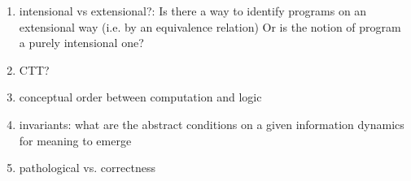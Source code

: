 \documentclass[]{article}
\begin{document}
\begin{enumerate}
\item intensional vs extensional?: Is there a way to identify programs on an extensional way (i.e. by an equivalence relation) Or is the notion of program a purely intensional one?

\item CTT?

\item conceptual order between computation and logic

\item invariants: what are the abstract conditions on a given information dynamics for meaning to emerge

\item pathological vs. correctness 
\end{enumerate}
\end{document}
